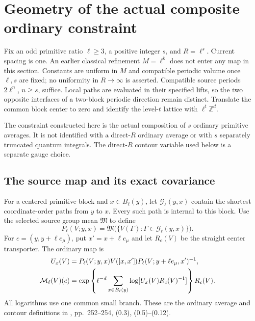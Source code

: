 \section{Geometry of the actual composite ordinary constraint}
\label{cmg-section}

Fix an odd primitive ratio $\ell\ge3$, a positive integer $s$, and
$R=\ell^s$. Current spacing is one. An earlier classical refinement
$M=\ell^k$ does not enter any map in this section. Constants are uniform
in $M$ and compatible periodic volume once $\ell,s$ are fixed; no
uniformity in $R\to\infty$ is asserted. Compatible source periods
$2\ell^n$, $n\ge s$, suffice. Local paths are evaluated in their specified
lifts, so the two opposite interfaces of a two-block periodic direction
remain distinct. Translate the common block center to zero and identify
the level-$t$ lattice with $\ell^t\mathbb Z^d$.

The constraint constructed here is the actual composition of $s$
ordinary primitive averages. It is not identified with a direct-$R$
ordinary average or with $s$ separately truncated quantum integrals.
The direct-$R$ contour variable used below is a separate gauge choice.

\subsection{The source map and its exact covariance}
\label{cmg-source-section}

For a centered primitive block and $x\in B_\ell(y)$, let
$\mathcal G_\ell(y,x)$ contain the shortest coordinate-order paths
from $y$ to $x$. Every such path is internal to this block. Use the
selected source group mean $\mathfrak M$ to define
\begin{equation}
 P_\ell(V;y,x)=
 \mathfrak M\bigl(\{V(\Gamma):\Gamma\in\mathcal G_\ell(y,x)\}\bigr).
 \label{cmg-contour}
\end{equation}
For $c=(y,y+\ell e_\mu)$, put $x'=x+\ell e_\mu$ and let
$R_c(V)$ be the straight center transporter. The ordinary map is
\begin{align}
 U_x(V)&=P_\ell(V;y,x)V([x,x'])P_\ell(V;y+\ell e_\mu,x')^{-1},
 \notag\\
 \mathcal M_\ell(V)(c)
 &=\exp\left\{\ell^{-d}\sum_{x\in B_\ell(y)}
          \log[U_x(V)R_c(V)^{-1}]\right\}R_c(V).
 \label{cmg-ordinary}
\end{align}
All logarithms use one common small branch. These are the ordinary
average and contour definitions in \cite{balaban109cm}, pp.~252--254,
(0.3), (0.5)--(0.12).

